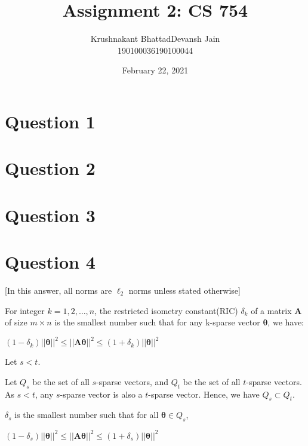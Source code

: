 \documentclass[fleqn, 11pt]{article}
\title{Assignment 2: CS 754}
\author{ 
\begin{tabular}{|c|c|}
     \hline
     \textsf{Krushnakant Bhattad} & \textsf{Devansh Jain} \\
     \hline
     \textsf{190100036} & \textsf{190100044}\\
     \hline
\end{tabular}
}
\date{February 22, 2021}
\newcommand{\bs}[1]{\boldsymbol{#1}}
\begin{document}
\maketitle
\tableofcontents
\thispagestyle{empty}
\setcounter{page}{0}

\newpage
\section*{Question 1}
\setcounter{equation}{0}


\newpage
\section*{Question 2}
\setcounter{equation}{0}


\newpage
\section*{Question 3}
\setcounter{equation}{0}


\newpage
\section*{Question 4}
\setcounter{equation}{0}

[In this answer, all norms are $\ell_2$ norms unless stated otherwise]

For integer $k = 1,2, \ldots ,n$, the restricted isometry constant(RIC) $\delta_k$ of 
a matrix $\bs{A}$ of size $m \times n$ is the smallest number such that for any
k-sparse vector $\bs{\theta}$, we have:
\begin{center}
    $ (1-\delta_k) || \bs{\theta} ||^2 \leq || \bs{A\theta} ||^2 
    \leq (1+\delta_k) || \bs{\theta} ||^2 $
\end{center}


\medskip

Let $s<t$.

Let $Q_s$ be the set of all $s$-sparse vectors, and $Q_t$ be the set of all 
$t$-sparse vectors. As $s<t$, any $s$-sparse vector is also a $t$-sparse vector.
Hence, we have $Q_s \subset Q_t$.

$\delta_s$ is the smallest number such that for all $ \bs{\theta} \in Q_s$, 
\begin{center}
    $ (1-\delta_s) || \bs{\theta} ||^2 \leq || \bs{A\theta} ||^2 
    \leq (1+\delta_s) || \bs{\theta} ||^2 $
\end{center}
\end{document}
